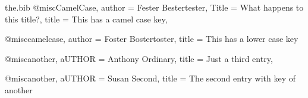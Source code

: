 \begin{filecontents}[overwrite]{the.bib}
@misc{CamelCase,
  author = {Fester Bestertester},
  Title = {What happens to this title?},
  title = {This has a camel case key},
}

@misc{camelcase,
  author = {Foster Bostertoster},
  title = {This has a lower case key}
}

@misc{another, 
 aUTHOR = {Anthony Ordinary},
 title = {Just a third entry},
}

@misc{another,
  aUTHOR = {Susan Second},
  title = {The second entry with key of another}
}
\end{filecontents}
\documentclass{article}
\usepackage{hyperref}

I don't have much to say.
\cite{camelcase} and \cite{CamelCase} and \cite{another}.

